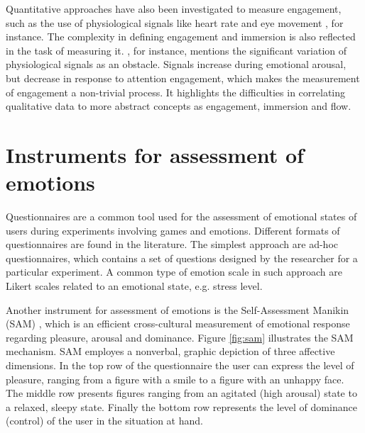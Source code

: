 Quantitative approaches have also been investigated to measure engagement, such as the use of physiological signals like heart rate \parencite{ravaja20051} and eye movement \parencite{jennett2008measuring}, for instance. The complexity in defining engagement and immersion is also reflected in the task of measuring it. \textcite{ravaja20051}, for instance, mentions the significant variation of physiological signals as an obstacle. Signals increase during emotional arousal, but decrease in response to attention engagement, which makes the measurement of engagement a non-trivial process. It highlights the difficulties in correlating qualitative data to more abstract concepts as engagement, immersion and flow.


\section{Instruments for assessment of emotions}

Questionnaires are a common tool used for the assessment of emotional states of users during experiments involving games and emotions. Different formats of questionnaires are found in the literature. The simplest approach are ad-hoc questionnaires, which contains a set of questions designed by the researcher for a particular experiment. A common type of emotion scale in such approach are Likert scales related to an emotional state, e.g. stress level.

Another instrument for assessment of emotions is the Self-Assessment Manikin (SAM) \parencite{morris1995observations}, which is an efficient cross-cultural measurement of emotional response regarding pleasure, arousal and dominance. Figure \ref{fig:sam} illustrates the SAM mechanism. SAM employes a nonverbal, graphic depiction of three affective dimensions. In the top row of the questionnaire the user can express the level of pleasure, ranging from a figure with a smile to a figure with an unhappy face. The middle row presents figures ranging from an agitated (high arousal) state to a relaxed, sleepy state. Finally the bottom row represents the level of dominance (control) of the user in the situation at hand.

